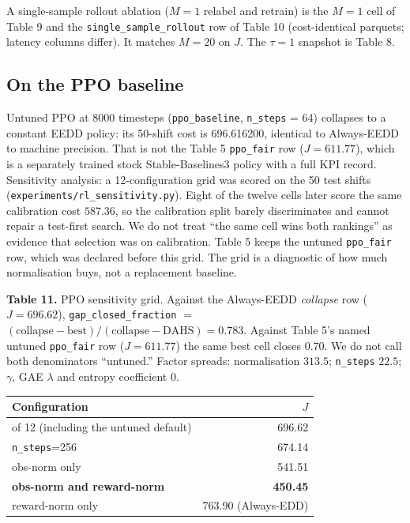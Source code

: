\documentclass[review,3p,times]{elsarticle}
\newcounter{none}
\theoremstyle{definition}
\begin{document}
A single-sample rollout ablation (\(M=1\) relabel and retrain) is the
\(M=1\) cell of Table 9 and the \texttt{single\_sample\_rollout} row of
Table 10 (cost-identical parquets; latency columns differ). It matches
\(M=20\) on \(J\). The \(\tau=1\) snapshot is Table 8.

\subsection{On the PPO baseline}\label{on-the-ppo-baseline}

Untuned PPO at 8000 timesteps (\texttt{ppo\_baseline}, \texttt{n\_steps}
= 64) collapses to a constant EEDD policy: its 50-shift cost is
696.616200, identical to Always-EEDD to machine precision. That is not
the Table 5 \texttt{ppo\_fair} row (\(J=611.77\)), which is a separately
trained stock Stable-Baselines3 policy with a full KPI record.
Sensitivity analysis: a 12-configuration grid was scored on the 50 test
shifts (\texttt{experiments/rl\_sensitivity.py}). Eight of the twelve
cells later score the same calibration cost \(587.36\), so the
calibration split barely discriminates and cannot repair a test-first
search. We do not treat ``the same cell wins both rankings'' as evidence
that selection was on calibration. Table 5 keeps the untuned
\texttt{ppo\_fair} row, which was declared before this grid. The grid is
a diagnostic of how much normalisation buys, not a replacement baseline.

\textbf{Table 11.} PPO sensitivity grid. Against the Always-EEDD
\emph{collapse} row (\(J=696.62\)), \texttt{gap\_closed\_fraction} \(=\)
\((\text{collapse}-\text{best})/(\text{collapse}-\text{DAHS}) = 0.783\).
Against Table 5's named untuned \texttt{ppo\_fair} row (\(J=611.77\))
the same best cell closes \(0.70\). We do not call both denominators
``untuned.'' Factor spreads: normalisation \(313.5\); \texttt{n\_steps}
\(22.5\); \(\gamma\), GAE \(\lambda\) and entropy coefficient \(0\).

{\def\LTcaptype{none} %
\begin{longtable}[]{@{}lr@{}}
\toprule\noalign{}
Configuration & \(J\) \\
\midrule\noalign{}
\endhead
\bottomrule\noalign{}
\endlastfoot
8 of 12 (including the untuned default) & 696.62 \\
\texttt{n\_steps}=256 & 674.14 \\
obs-norm only & 541.51 \\
\textbf{obs-norm and reward-norm} & \textbf{450.45} \\
reward-norm only & 763.90 (Always-EDD) \\
\end{longtable}
}
\end{document}
